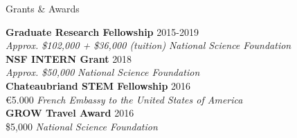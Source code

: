 \documentclass{resume} %
\begin{document}
\begin{minipage}{\textwidth}

\begin{rSection}{Grants \& Awards}
\vspace{.15cm}




{\bf Graduate Research Fellowship} \hfill {2015-2019} \\
{\em Approx. \$102,000 + \$36,000 (tuition)} \hfill {\em National Science Foundation} \\


{\bf NSF INTERN Grant} \hfill {2018} \\
{\em Approx. \${50,000}} \hfill {\em National Science Foundation} \\


{\bf Chateaubriand STEM Fellowship} \hfill {2016} \\
{\euro{5.000}} \hfill {\em French Embassy to the United States of America} \\


{\bf GROW Travel Award} \hfill {2016} \\
{\$5,000} \hfill {\em National Science Foundation} \\




\end{rSection}
\end{minipage}
\end{document}
